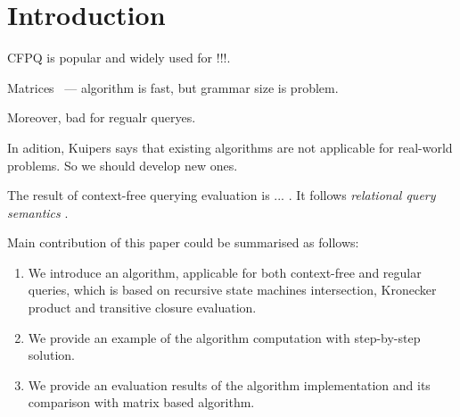 \section{Introduction}

CFPQ is popular and widely used for !!!.

Matrices~\cite{Azimov:2018:CPQ:3210259.3210264} --- algorithm is fast, but grammar size is problem.

Moreover, bad for regualr queryes.

In adition, Kuipers says that existing algorithms are not applicable for real-world problems. So we should develop new ones.

The result of context-free querying evaluation is ... . It follows \textit{relational query semantics} \cite{Hellings2014ConjunctiveCP}.

Main contribution of this paper could be summarised as follows:

\begin{enumerate}
\item We introduce an algorithm, applicable for both context-free and regular queries, which is based on recursive state machines intersection, Kronecker product and transitive closure evaluation.
\item We provide an example of the algorithm computation with step-by-step solution.
\item We provide an evaluation results of the algorithm implementation and its comparison with matrix based algorithm. 
\end{enumerate}

